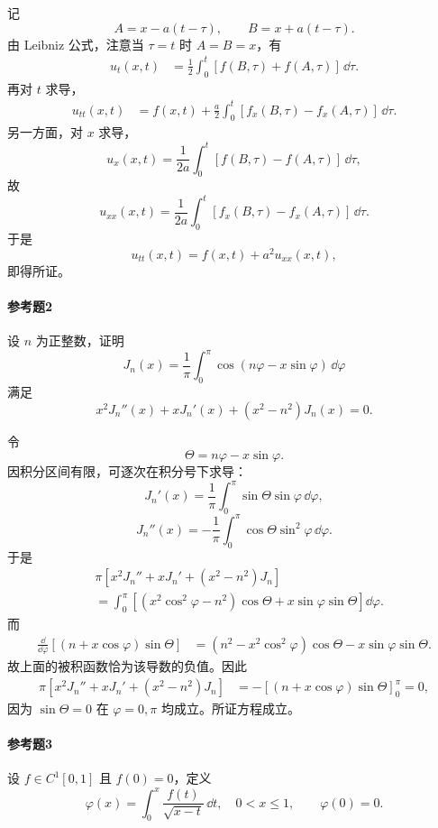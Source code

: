 \begin{xsolution}
记
\[
A=x-a(t-\tau),\qquad B=x+a(t-\tau).
\]
由 Leibniz 公式，注意当 $\tau=t$ 时 $A=B=x$，有
\[
\begin{aligned}
u_t(x,t)
&=\frac12\int_0^t[f(B,\tau)+f(A,\tau)]\,\dd\tau.
\end{aligned}
\]
再对 $t$ 求导，
\[
\begin{aligned}
u_{tt}(x,t)
&=f(x,t)+\frac a2\int_0^t
[f_x(B,\tau)-f_x(A,\tau)]\,\dd\tau.
\end{aligned}
\]
另一方面，对 $x$ 求导，
\[
u_x(x,t)=\frac1{2a}\int_0^t[f(B,\tau)-f(A,\tau)]\,\dd\tau,
\]
故
\[
u_{xx}(x,t)=\frac1{2a}\int_0^t
[f_x(B,\tau)-f_x(A,\tau)]\,\dd\tau.
\]
于是
\[
u_{tt}(x,t)=f(x,t)+a^2u_{xx}(x,t),
\]
即得所证。
\end{xsolution}

\paragraph{参考题2}
设 $n$ 为正整数，证明
\[
J_n(x)=\frac1\pi\int_0^\pi\cos(n\varphi-x\sin\varphi)\,\dd\varphi
\]
满足
\[
x^2J_n''(x)+xJ_n'(x)+(x^2-n^2)J_n(x)=0.
\]

\begin{xsolution}
令
\[
\Theta=n\varphi-x\sin\varphi.
\]
因积分区间有限，可逐次在积分号下求导：
\[
J_n'(x)=\frac1\pi\int_0^\pi\sin\Theta\sin\varphi\,\dd\varphi,
\]
\[
J_n''(x)=-\frac1\pi\int_0^\pi\cos\Theta\sin^2\varphi\,\dd\varphi.
\]
于是
\[
\begin{aligned}
&\pi[x^2J_n''+xJ_n'+(x^2-n^2)J_n]\\
&=\int_0^\pi
\left[(x^2\cos^2\varphi-n^2)\cos\Theta
+x\sin\varphi\sin\Theta\right]\dd\varphi.
\end{aligned}
\]
而
\[
\begin{aligned}
\frac{\dd}{\dd\varphi}[(n+x\cos\varphi)\sin\Theta]
&=(n^2-x^2\cos^2\varphi)\cos\Theta
-x\sin\varphi\sin\Theta.
\end{aligned}
\]
故上面的被积函数恰为该导数的负值。因此
\[
\begin{aligned}
\pi[x^2J_n''+xJ_n'+(x^2-n^2)J_n]
&=-[(n+x\cos\varphi)\sin\Theta]_0^\pi=0,
\end{aligned}
\]
因为 $\sin\Theta=0$ 在 $\varphi=0,\pi$ 均成立。所证方程成立。
\end{xsolution}

\paragraph{参考题3}
设 $f\in C^1[0,1]$ 且 $f(0)=0$，定义
\[
\varphi(x)=\int_0^x\frac{f(t)}{\sqrt{x-t}}\,\dd t,
\quad0<x\leqslant1,
\qquad\varphi(0)=0.
\]

